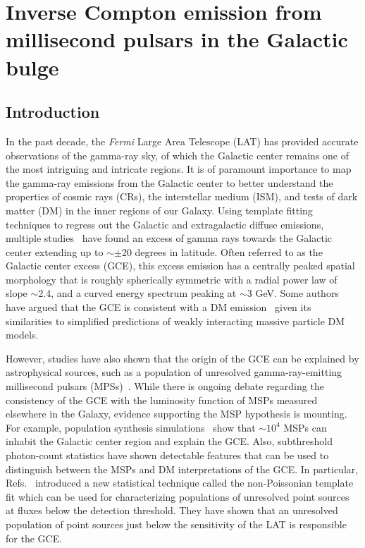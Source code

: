 \documentclass[doublespace,nopageskip]{VTthesis} %
\begin{document}
\chapter{Inverse Compton emission from millisecond pulsars in the Galactic bulge} \label{ch:IC_MSPs}

\section{Introduction}

In the past decade, the \emph{Fermi} Large Area Telescope (LAT) has provided accurate observations of the gamma-ray sky, of which the Galactic center remains one of the most intriguing and intricate regions. It is of paramount importance to map the gamma-ray emissions from the Galactic center to better understand the properties of cosmic rays (CRs), the interstellar medium (ISM), and tests of dark matter (DM) in the inner regions of our Galaxy. Using template fitting techniques to regress out the Galactic and extragalactic diffuse emissions, multiple studies~\cite{2009arXiv0910.2998G,2009arXiv0912.3828V,2011PhLB..697..412H,2012PhRvD..86h3511A,2013PhRvD..88h3521G,2014PhRvD..89f3515M,2013PDU.....2..118H,2014PhRvD..90b3526A,2016PDU....12....1D,2015JCAP...03..038C,2015PhRvD..91l3010Z,2016ApJ...819...44A,2017ApJ...840...43A} have found an excess of gamma rays towards the Galactic center extending up to $\sim\pm$20 degrees in latitude. Often referred to as the Galactic center excess (GCE), this excess emission has a centrally peaked spatial morphology that is roughly spherically symmetric with a radial power law of slope $\sim$2.4, and a curved energy spectrum peaking at $\sim$3 GeV. Some authors have argued that the GCE is consistent with a DM emission~\cite{Goodenough:2009gk,Abazajian:2012pn,Gordon:2013vta,Macias:2013vya,Calore:2014xka,Daylan:2014rsa} given its similarities to simplified predictions of weakly interacting massive particle DM models.

However, studies have also shown that the origin of the GCE can be explained by astrophysical sources, such as a population of unresolved gamma-ray-emitting millisecond pulsars (MPSs)~\cite{Abazajian:2010zy,Abazajian:2012pn,Gordon:2013vta,Macias:2013vya,Calore:2014xka,Daylan:2014rsa}. While there is ongoing debate regarding the consistency of the GCE with the luminosity function of MSPs measured elsewhere in the Galaxy\cite{Cholis:2014lta, Hooper:2015jlu, Ploeg:2017vai, Bartels:2018xom}, evidence supporting the MSP hypothesis is mounting. For example, population synthesis simulations~\cite{Gonthier:2018ymi} show that $\sim$$10^4$ MSPs can inhabit the Galactic center region and explain the GCE. Also, subthreshold photon-count statistics have shown detectable features that can be used to distinguish between the MSPs and DM interpretations of the GCE. In particular, Refs.~\cite{Lee:2015fea,Mishra-Sharma:2016gis} introduced a new statistical technique called the non-Poissonian template fit which can be used for characterizing populations of unresolved point sources at fluxes below the detection threshold. They have shown that an unresolved population of point sources just below the sensitivity of the LAT is responsible for the GCE.
\end{document}
